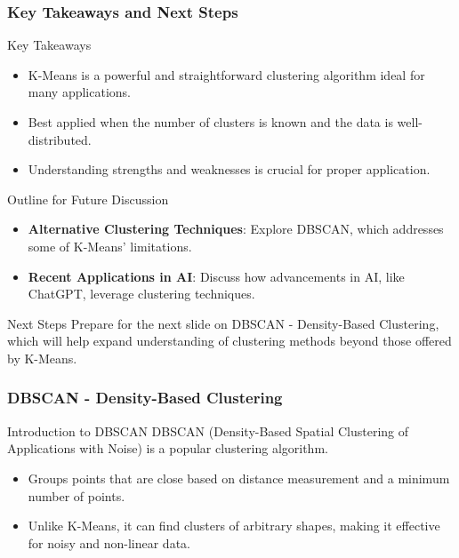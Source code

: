 \documentclass[aspectratio=169]{beamer}
\begin{document}
\begin{frame}[fragile]
    \frametitle{Key Takeaways and Next Steps}
    \begin{block}{Key Takeaways}
        \begin{itemize}
            \item K-Means is a powerful and straightforward clustering algorithm ideal for many applications.
            \item Best applied when the number of clusters is known and the data is well-distributed.
            \item Understanding strengths and weaknesses is crucial for proper application.
        \end{itemize}
    \end{block}
    
    \begin{block}{Outline for Future Discussion}
        \begin{itemize}
            \item \textbf{Alternative Clustering Techniques}: Explore DBSCAN, which addresses some of K-Means' limitations.
            \item \textbf{Recent Applications in AI}: Discuss how advancements in AI, like ChatGPT, leverage clustering techniques.
        \end{itemize}
    \end{block}
    
    \begin{block}{Next Steps}
        Prepare for the next slide on DBSCAN - Density-Based Clustering, which will help expand understanding of clustering methods beyond those offered by K-Means.
    \end{block}
\end{frame}

\begin{frame}[fragile]
    \frametitle{DBSCAN - Density-Based Clustering}
    \begin{block}{Introduction to DBSCAN}
        DBSCAN (Density-Based Spatial Clustering of Applications with Noise) is a popular clustering algorithm. 
        \begin{itemize}
            \item Groups points that are close based on distance measurement and a minimum number of points.
            \item Unlike K-Means, it can find clusters of arbitrary shapes, making it effective for noisy and non-linear data.
        \end{itemize}
    \end{block}
\end{frame}
\end{document}
